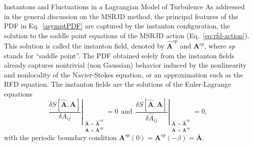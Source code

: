 \begin{chapter}{Instantons and Fluctuations in a Lagrangian Model of Turbulence}
As addressed in the general discussion on the MSRJD method, the principal features of the PDF in Eq.~\eqref{asymptPDF} are captured by the instanton configuration, the solution to the saddle point equations of the MSRJD action (Eq.~\eqref{eq:rfd-action}).
This solution is called the instanton field, denoted by $\hat {\mathbf{A}}^{sp}$ and ${\mathbf{A}}^{sp}$, where $sp$ stands for \enquote{saddle point}.
The PDF obtained solely from the instanton fields already captures nontrivial (non Gaussian) behavior induced by the nonlinearity and nonlocality of the Navier-Stokes equation, or an approximation such as the RFD equation.
The instanton fields are the solutions of the Euler-Lagrange equations
\begin{equation} \label{eq:rfd-eq-motion}
 \left. \frac{\delta S[\hat {\mathbf{A}}, {\mathbf{A}}]}{\delta A_{ij}} \right|_{\substack{\hat {\mathbf{A}} = \hat {\mathbf{A}}^{sp} \\ {\mathbf{A}} = {\mathbf{A}}^{sp}}} \!\!\!\!\!\! = 0 \ \ \mbox{and} \ \ 
 \left. \frac{\delta S[\hat {\mathbf{A}}, {\mathbf{A}}]}{\delta \hat A_{ij}} \right|_{\substack{\hat {\mathbf{A}} = \hat {\mathbf{A}}^{sp} \\ {\mathbf{A}} = {\mathbf{A}}^{sp}}} \!\!\!\!\!\! = 0  \mbox{,}
\end{equation}
with the periodic boundary condition $ {\mathbf{A}}^{sp}(0) = {\mathbf{A}}^{sp}(- \beta) = \bar {\mathbf{A}} $.


\end{chapter}
